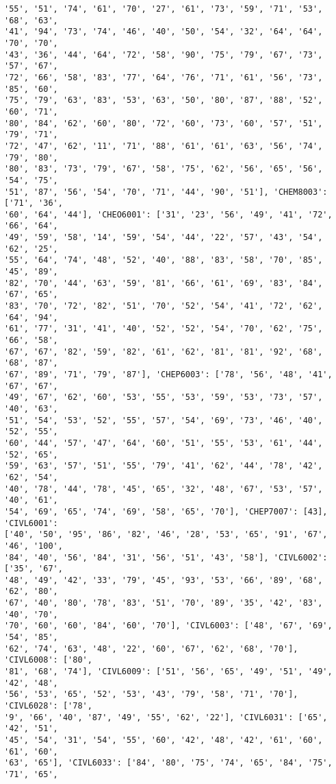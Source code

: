 \documentclass[11pt]{article}
\begin{document}
\begin{Verbatim}[commandchars=\\\{\}]
'55', '51', '74', '61', '70', '27', '61', '73', '59', '71', '53', '68', '63',
'41', '94', '73', '74', '46', '40', '50', '54', '32', '64', '64', '70', '70',
'43', '36', '44', '64', '72', '58', '90', '75', '79', '67', '73', '57', '67',
'72', '66', '58', '83', '77', '64', '76', '71', '61', '56', '73', '85', '60',
'75', '79', '63', '83', '53', '63', '50', '80', '87', '88', '52', '60', '71',
'80', '84', '62', '60', '80', '72', '60', '73', '60', '57', '51', '79', '71',
'72', '47', '62', '11', '71', '88', '61', '61', '63', '56', '74', '79', '80',
'80', '83', '73', '79', '67', '58', '75', '62', '56', '65', '56', '54', '75',
'51', '87', '56', '54', '70', '71', '44', '90', '51'], 'CHEM8003': ['71', '36',
'60', '64', '44'], 'CHEO6001': ['31', '23', '56', '49', '41', '72', '66', '64',
'49', '59', '58', '14', '59', '54', '44', '22', '57', '43', '54', '62', '25',
'55', '64', '74', '48', '52', '40', '88', '83', '58', '70', '85', '45', '89',
'82', '70', '44', '63', '59', '81', '66', '61', '69', '83', '84', '67', '65',
'83', '70', '72', '82', '51', '70', '52', '54', '41', '72', '62', '64', '94',
'61', '77', '31', '41', '40', '52', '52', '54', '70', '62', '75', '66', '58',
'67', '67', '82', '59', '82', '61', '62', '81', '81', '92', '68', '68', '87',
'67', '89', '71', '79', '87'], 'CHEP6003': ['78', '56', '48', '41', '67', '67',
'49', '67', '62', '60', '53', '55', '53', '59', '53', '73', '57', '40', '63',
'51', '54', '53', '52', '55', '57', '54', '69', '73', '46', '40', '52', '55',
'60', '44', '57', '47', '64', '60', '51', '55', '53', '61', '44', '52', '65',
'59', '63', '57', '51', '55', '79', '41', '62', '44', '78', '42', '62', '54',
'40', '78', '44', '78', '45', '65', '32', '48', '67', '53', '57', '40', '61',
'54', '69', '65', '74', '69', '58', '65', '70'], 'CHEP7007': [43], 'CIVL6001':
['40', '50', '95', '86', '82', '46', '28', '53', '65', '91', '67', '46', '100',
'84', '40', '56', '84', '31', '56', '51', '43', '58'], 'CIVL6002': ['35', '67',
'48', '49', '42', '33', '79', '45', '93', '53', '66', '89', '68', '62', '80',
'67', '40', '80', '78', '83', '51', '70', '89', '35', '42', '83', '40', '70',
'70', '60', '60', '84', '60', '70'], 'CIVL6003': ['48', '67', '69', '54', '85',
'62', '74', '63', '48', '22', '60', '67', '62', '68', '70'], 'CIVL6008': ['80',
'81', '68', '74'], 'CIVL6009': ['51', '56', '65', '49', '51', '49', '42', '48',
'56', '53', '65', '52', '53', '43', '79', '58', '71', '70'], 'CIVL6028': ['78',
'9', '66', '40', '87', '49', '55', '62', '22'], 'CIVL6031': ['65', '42', '51',
'45', '54', '31', '54', '55', '60', '42', '48', '42', '61', '60', '61', '60',
'63', '65'], 'CIVL6033': ['84', '80', '75', '74', '65', '84', '75', '71', '65',

\end{Verbatim}
\end{document}
